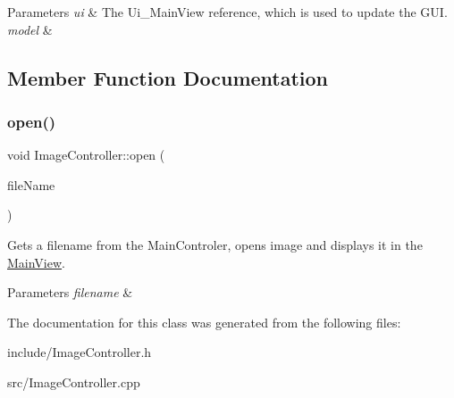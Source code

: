 \begin{DoxyParams}{Parameters}
{\em ui} & The Ui\+\_\+\+Main\+View reference, which is used to update the G\+UI. \\
\hline
{\em model} & \\
\hline
\end{DoxyParams}


\subsection{Member Function Documentation}
\mbox{\label{classImageController_a3f5976d87977aa1cda7b5a9a7ad0f03b}} 
\subsubsection{\texorpdfstring{open()}{open()}}
{\footnotesize\ttfamily void Image\+Controller\+::open (\begin{DoxyParamCaption}\item[{const Q\+String \&}]{file\+Name }\end{DoxyParamCaption})}



Gets a filename from the Main\+Controler, opens image and displays it in the \hyperlink{classMainView}{Main\+View}. 


\begin{DoxyParams}{Parameters}
{\em filename} & \\
\hline
\end{DoxyParams}


The documentation for this class was generated from the following files\+:\begin{DoxyCompactItemize}
\item 
include/Image\+Controller.\+h\item 
src/Image\+Controller.\+cpp\end{DoxyCompactItemize}

